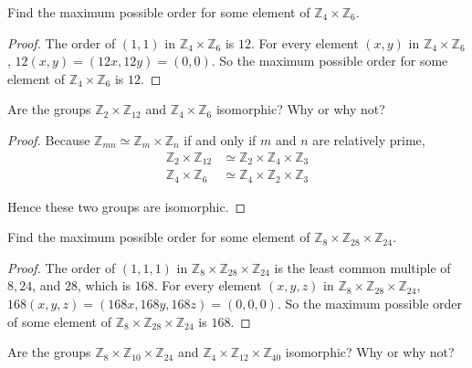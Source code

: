 \begin{exercise}
    Find the maximum possible order for some element of $\mathbb{Z}_{4}\times\mathbb{Z}_{6}$.
\end{exercise}

\begin{proof}
    The order of $(1,1)$ in $\mathbb{Z}_{4}\times\mathbb{Z}_{6}$ is $12$. For every element $(x,y)$ in $\mathbb{Z}_{4}\times\mathbb{Z}_{6}$, $12(x,y) = (12x,12y) = (0,0)$. So the maximum possible order for some element of $\mathbb{Z}_{4}\times\mathbb{Z}_{6}$ is $12$.
\end{proof}

\begin{exercise}
    Are the groups $\mathbb{Z}_{2}\times\mathbb{Z}_{12}$ and $\mathbb{Z}_{4}\times\mathbb{Z}_{6}$ isomorphic? Why or why not?
\end{exercise}

\begin{proof}
    Because $\mathbb{Z}_{mn}\simeq \mathbb{Z}_{m}\times\mathbb{Z}_{n}$ if and only if $m$ and $n$ are relatively prime,
    \begin{align*}
        \mathbb{Z}_{2}\times\mathbb{Z}_{12} & \simeq \mathbb{Z}_{2}\times\mathbb{Z}_{4}\times\mathbb{Z}_{3} \\
        \mathbb{Z}_{4}\times\mathbb{Z}_{6}  & \simeq \mathbb{Z}_{4}\times\mathbb{Z}_{2}\times\mathbb{Z}_{3}
    \end{align*}

    Hence these two groups are isomorphic.
\end{proof}

\begin{exercise}
    Find the maximum possible order for some element of $\mathbb{Z}_{8}\times\mathbb{Z}_{28}\times\mathbb{Z}_{24}$.
\end{exercise}

\begin{proof}
    The order of $(1,1,1)$ in $\mathbb{Z}_{8}\times\mathbb{Z}_{28}\times\mathbb{Z}_{24}$ is the least common multiple of $8,24$, and $28$, which is $168$. For every element $(x,y,z)$ in $\mathbb{Z}_{8}\times\mathbb{Z}_{28}\times\mathbb{Z}_{24}$, $168(x,y,z) = (168x,168y,168z) = (0,0,0)$. So the maximum possible order of some element of $\mathbb{Z}_{8}\times\mathbb{Z}_{28}\times\mathbb{Z}_{24}$ is $168$.
\end{proof}

\begin{exercise}
    Are the groups $\mathbb{Z}_{8}\times\mathbb{Z}_{10}\times\mathbb{Z}_{24}$ and $\mathbb{Z}_{4}\times\mathbb{Z}_{12}\times\mathbb{Z}_{40}$ isomorphic? Why or why not?
\end{exercise}

